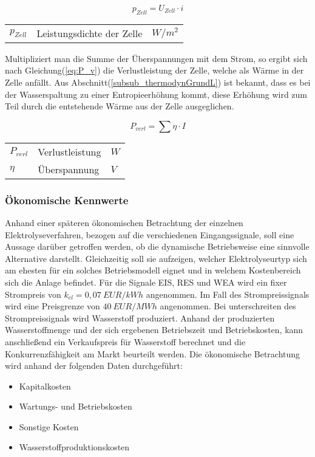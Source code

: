 \documentclass[onecolumn,10pt,titlepage]{article}
\begin{document}
			\begin{equation}
			\label{eq:p_zell}
			p_{Zell} = U_{Zell}\cdot i
			\end{equation}

			\begin{table}[H]
				\begin{tabular*}{\textwidth}{lll}
					$p_{Zell}$&Leistungsdichte der Zelle&$W/m^2$\\
				\end{tabular*}
			\end{table}

			Multipliziert man die Summe der Überspannungen mit dem Strom, so ergibt sich nach Gleichung(\ref{eq:P_v}) die Verlustleistung der Zelle, welche als Wärme in der Zelle anfällt. Aus Abschnitt(\ref{subsub_thermodynGrundL}) ist bekannt, dass es bei der Wasserspaltung zu einer Entropieerhöhung kommt, diese Erhöhung wird zum Teil durch die entstehende Wärme aus der Zelle ausgeglichen.

			\begin{equation}
			\label{eq:P_v}
			P_{verl} = \sum{\eta}\cdot I
			\end{equation}

			\begin{table}[H]
				\begin{tabular*}{\textwidth}{lll}
					$P_{verl}$&Verlustleistung&$W$\\
					$\eta$&Überspannung&$V$\\
				\end{tabular*}
			\end{table}


			\subsubsection*{Ökonomische Kennwerte}
			Anhand einer späteren ökonomischen Betrachtung der einzelnen Elektrolyseverfahren, bezogen auf die verschiedenen Eingangssignale, soll eine Aussage darüber getroffen werden, ob die dynamische Betriebsweise eine sinnvolle Alternative darstellt. Gleichzeitig soll sie aufzeigen, welcher Elektrolyseurtyp sich am ehesten für ein solches Betriebsmodell eignet und in welchem Kostenbereich sich die Anlage befindet. Für die Signale EIS, RES und WEA wird ein fixer Strompreis von $k_{el}= 0,07~EUR/kWh$ angenommen.\cite{DeutscheEnergieAgenturGmbH.06.2018} Im Fall des Strompreissignals wird eine Preisgrenze von $40~EUR/MWh$ angenommen. Bei unterschreiten des Strompreissignals wird Wasserstoff produziert. Anhand der produzierten Wasserstoffmenge und der sich ergebenen Betriebszeit und Betriebskosten, kann anschließend ein Verkaufspreis für Wasserstoff berechnet und die Konkurrenzfähigkeit am Markt beurteilt werden. Die ökonomische Betrachtung wird anhand der folgenden Daten durchgeführt:
			\begin{itemize}
				\item Kapitalkosten
				\item Wartungs- und Betriebskosten
				\item Sonstige Kosten
				\item Wasserstoffproduktionskosten
			\end{itemize}
\end{document}
